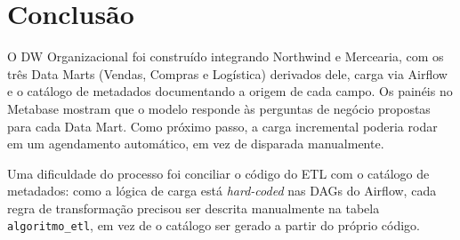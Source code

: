 \chapter{Conclusão}
\label{cap:conclusao}

O DW Organizacional foi construído integrando Northwind e Mercearia, com os três Data Marts (Vendas, Compras e Logística) derivados dele, carga via Airflow e o catálogo de metadados documentando a origem de cada campo. Os painéis no Metabase mostram que o modelo responde às perguntas de negócio propostas para cada Data Mart. Como próximo passo, a carga incremental poderia rodar em um agendamento automático, em vez de disparada manualmente.

Uma dificuldade do processo foi conciliar o código do ETL com o catálogo de metadados: como a lógica de carga está \textit{hard-coded} nas DAGs do Airflow, cada regra de transformação precisou ser descrita manualmente na tabela \texttt{algoritmo\_etl}, em vez de o catálogo ser gerado a partir do próprio código.

